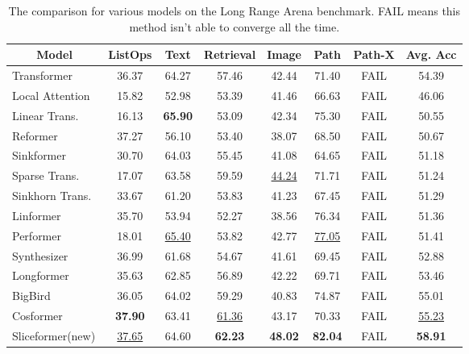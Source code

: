 \begin{table}[htbp]
  \centering
  \caption{The comparison for various models on the Long Range Arena benchmark. FAIL means this method isn't able to converge all the time.}
    \begin{tabular}{l|cccccc|c}
    \toprule
    \multicolumn{1}{c|}{Model} & ListOps & Text  & Retrieval & Image & Path  & Path-X & Avg. Acc\\
    \midrule
    Transformer~\cite{vaswani2017attention} & 36.37 & 64.27 & 57.46 & 42.44 & 71.40 & FAIL  & 54.39 \\
    \midrule
    Local Attention~\cite{tay2021long} & 15.82 & 52.98 & 53.39 & 41.46 & 66.63 & FAIL  & 46.06 \\
    Linear Trans.~\cite{katharopoulos2020transformers} & 16.13 & \textbf{65.90} & 53.09 & 42.34 & 75.30 & FAIL  & 50.55 \\
    Reformer~\cite{kitaev2020reformer}  & 37.27 & 56.10 & 53.40 & 38.07 & 68.50 & FAIL  & 50.67 \\
    Sinkformer~\cite{sander2022sinkformers} & 30.70 & 64.03 &  55.45 & 41.08 & 64.65 & FAIL & 51.18 \\
    Sparse Trans.~\cite{child2019generating} & 17.07 & 63.58 & 59.59& \underline{44.24} & 71.71 & FAIL  & 51.24 \\
    Sinkhorn Trans.~\cite{tay2020sparse} & 33.67 & 61.20 & 53.83 & 41.23 & 67.45 & FAIL  & 51.29 \\
    Linformer~\cite{wang2020linformer} & 35.70 & 53.94 & 52.27 & 38.56 & 76.34 & FAIL  & 51.36 \\
    Performer~\cite{choromanski2021rethinking} & 18.01 & \underline{65.40} & 53.82 & 42.77 & \underline{77.05} & FAIL  & 51.41 \\
    Synthesizer~\cite{tay2021synthesizer} & 36.99 & 61.68 & 54.67 & 41.61 & 69.45 & FAIL  & 52.88 \\
    Longformer~\cite{beltagy2020longformer} & 35.63 & 62.85 & 56.89 & 42.22 & 69.71 & FAIL  & 53.46 \\
    BigBird~\cite{zaheer2020big} & 36.05 & 64.02 & 59.29 & 40.83 & 74.87 & FAIL  & 55.01 \\
    Cosformer~\cite{zhen2022cosformer} & \textbf{37.90} & 63.41 & \underline{61.36} & 43.17 & 70.33 & FAIL  & \underline{55.23} \\
    \midrule
    Sliceformer(new) & \underline{37.65} &  64.60     &  \textbf{62.23}     &   \textbf{48.02}    &  \textbf{82.04}      &   FAIL  & \textbf{58.91}  \\
    \bottomrule
    \end{tabular}%
  \label{tab:addlabel}%
\end{table}%


